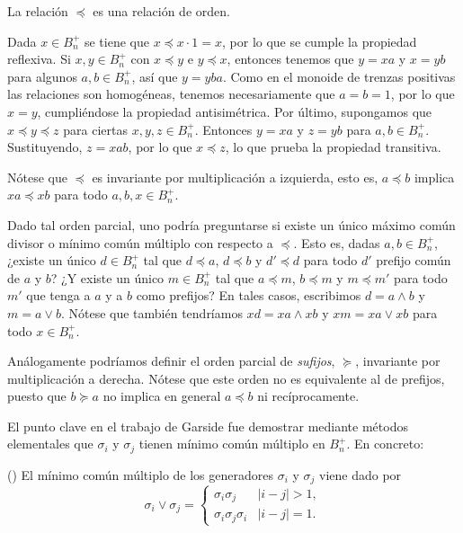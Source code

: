 \documentclass[TFG.tex]{subfiles}
\begin{document}
\begin{lemma}
La relación $\preccurlyeq$ es una relación de orden.
\end{lemma}
\begin{dem}
Dada $x\in B_n^+$ se tiene que $x\preccurlyeq x\cdot 1=x$, por lo que se cumple la propiedad reflexiva. Si $x,y\in B_n^+$ con $x \preccurlyeq y $ e $y \preccurlyeq x$, entonces tenemos que $y=xa$ y $x=yb$ para algunos $a,b\in B_n^+$, así que $y=yba$. Como en el monoide de trenzas positivas las relaciones son homogéneas, tenemos necesariamente que $a=b=1$, por lo que $x=y$, cumpliéndose la propiedad antisimétrica. Por último, supongamos que $x\preccurlyeq y\preccurlyeq z$ para ciertas $x,y,z\in B_n^+$. Entonces $y=xa$ y $z=yb$ para $a,b\in B_n^+$. Sustituyendo, $z=xab$, por lo que $x\preccurlyeq z$, lo que prueba la propiedad transitiva. \QED
\end{dem}
Nótese que $\preccurlyeq$ es invariante por multiplicación a izquierda, esto es, $a\preccurlyeq b$ implica $xa\preccurlyeq xb$ para todo $a,b,x\in B_n^+$. %

Dado tal orden parcial, uno podría preguntarse si existe un único máximo común divisor o mínimo común múltiplo con respecto a $\preccurlyeq$. Esto es, dadas $a,b\in B_n^+$, ¿existe un único $d\in B_n^+$ tal que $d\preccurlyeq a$, $d\preccurlyeq b$ y $d'\preccurlyeq d$ para todo $d'$ prefijo común de $a$ y $b$? ¿Y existe un único $m\in B_n^+$ tal que $a\preccurlyeq m$, $b\preccurlyeq m$ y $m\preccurlyeq m'$ para todo $m'$ que tenga a $a$ y a $b$ como prefijos? En tales casos, escribimos $d=a\land b$ y $m=a\lor b$. Nótese que también tendríamos $xd=xa\land xb$ y $xm=xa\lor xb$ para todo $x\in B_n^+$.

\begin{nota}
Análogamente podríamos definir el orden parcial de \emph{sufijos}, $\succcurlyeq$, invariante por multiplicación a derecha. Nótese que este orden no es equivalente al de prefijos, puesto que $b\succcurlyeq a$ no implica en general $a\preccurlyeq b$ ni recíprocamente. 
\end{nota}

El punto clave en el trabajo de Garside fue demostrar mediante métodos elementales que $\sigma_i$ y $\sigma_j$ tienen mínimo común múltiplo en $B_n^+$. En concreto:
\begin{prop}(\cite[Teorema 1.2]{Garside})
El mínimo común múltiplo de los generadores $\sigma_i$ y $\sigma_j$ viene dado por
$$\sigma_i\lor\sigma_j=\begin{cases}
\sigma_i\sigma_j & |i-j|>1,\\
\sigma_i\sigma_j\sigma_i & |i-j|=1.
\end{cases}$$
\end{prop}
\end{document}
